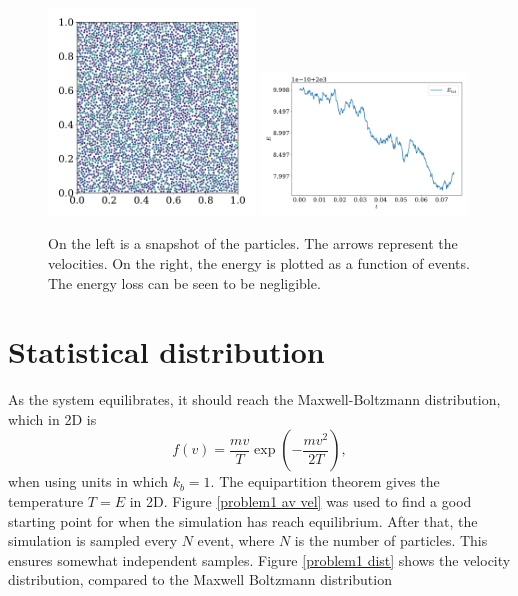 \documentclass{article}
\begin{document}
        \begin{figure}
            \centering
            \includegraphics[width=0.49\textwidth]{../plots/test_case_many_particles/test_case_many_particles.pdf}
            \includegraphics[width=0.49\textwidth]{../plots/test_case_many_particles/energy.pdf}
            \caption{On the left is a snapshot of the particles. The arrows represent the velocities. On the right, the energy is plotted as a function of events. The energy loss can be seen to be negligible.}
        \end{figure}

        \section*{Statistical distribution}
            As the system equilibrates, it should reach the Maxwell-Boltzmann distribution, which in 2D is
            \begin{equation*}
                f(v) = \frac{m v}{T} \exp \left(-\frac{m v^2}{2 T}\right),
            \end{equation*}
            when using units in which $k_b = 1$. The equipartition theorem gives the temperature $T = E$ in 2D. Figure \ref{problem1 av vel} was used to find a good starting point for when the simulation has reach equilibrium. After that, the simulation is sampled every $N$ event, where $N$ is the number of particles. This ensures somewhat independent samples. Figure \ref{problem1 dist} shows the velocity distribution, compared to the Maxwell Boltzmann distribution
\end{document}

